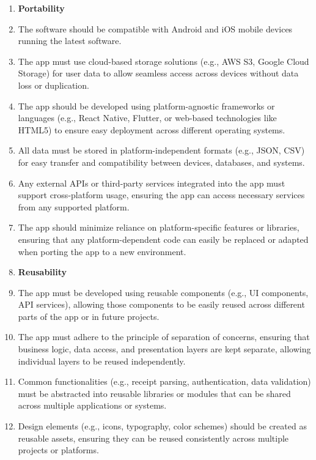 \documentclass[12pt]{article}
\begin{document}
\begin{enumerate}[label=NFR\arabic*]
  \item[]  \textbf{Portability}
  \item The software should be compatible with Android and iOS mobile devices
  running the latest software.
  \item The app must use cloud-based storage solutions (e.g., AWS S3, Google
  Cloud Storage) for user data to allow seamless access across devices without
  data loss or duplication.
  \item The app should be developed using platform-agnostic frameworks or
  languages (e.g., React Native, Flutter, or web-based technologies like HTML5)
  to ensure easy deployment across different operating systems.
  \item All data must be stored in platform-independent formats (e.g., JSON,
  CSV) for easy transfer and compatibility between devices, databases, and
  systems.
  \item Any external APIs or third-party services integrated into the app must
  support cross-platform usage, ensuring the app can access necessary services
  from any supported platform.
  \item The app should minimize reliance on platform-specific features or
  libraries, ensuring that any platform-dependent code can easily be replaced or
  adapted when porting the app to a new environment.

  \item[] \textbf{Reusability} 
  \item The app must be developed using reusable components (e.g., UI
  components, API services), allowing those components to be easily reused
  across different parts of the app or in future projects.
  \item The app must adhere to the principle of separation of concerns, ensuring
  that business logic, data access, and presentation layers are kept separate,
  allowing individual layers to be reused independently.
  \item Common functionalities (e.g., receipt parsing, authentication, data
  validation) must be abstracted into reusable libraries or modules that can be
  shared across multiple applications or systems.
  \item Design elements (e.g., icons, typography, color schemes) should be
  created as reusable assets, ensuring they can be reused consistently across
  multiple projects or platforms.


\end{enumerate}
\end{document}
